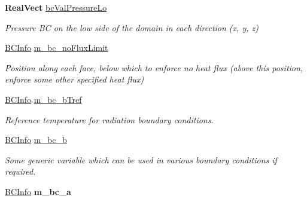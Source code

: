 \begin{DoxyCompactItemize}
\textbf{ Real\+Vect} \hyperlink{class_mushy_layer_params_ac1b2a3539ae1d6b7d716d3796ca221db}{bc\+Val\+Pressure\+Lo}
\begin{DoxyCompactList}\small\item\em Pressure BC on the low side of the domain in each direction (x, y, z) \end{DoxyCompactList}\item 
\mbox{\label{class_mushy_layer_params_a2af9063a5030a32afcc3c2c99933a624}} 
\hyperlink{class_b_c_info}{B\+C\+Info} \hyperlink{class_mushy_layer_params_a2af9063a5030a32afcc3c2c99933a624}{m\+\_\+bc\+\_\+no\+Flux\+Limit}
\begin{DoxyCompactList}\small\item\em Position along each face, below which to enforce no heat flux (above this position, enforce some other specified heat flux) \end{DoxyCompactList}\item 
\mbox{\label{class_mushy_layer_params_a72dce1a01cda103fc315cdab0b0f383a}} 
\hyperlink{class_b_c_info}{B\+C\+Info} \hyperlink{class_mushy_layer_params_a72dce1a01cda103fc315cdab0b0f383a}{m\+\_\+bc\+\_\+b\+Tref}
\begin{DoxyCompactList}\small\item\em Reference temperature for radiation boundary conditions. \end{DoxyCompactList}\item 
\mbox{\label{class_mushy_layer_params_a8b98ef06ad47d5eba490031d95135f42}} 
\hyperlink{class_b_c_info}{B\+C\+Info} \hyperlink{class_mushy_layer_params_a8b98ef06ad47d5eba490031d95135f42}{m\+\_\+bc\+\_\+b}
\begin{DoxyCompactList}\small\item\em Some generic variable which can be used in various boundary conditions if required. \end{DoxyCompactList}\item 
\mbox{\label{class_mushy_layer_params_a355e6ad5af4829cef3c4ded140445787}} 
\hyperlink{class_b_c_info}{B\+C\+Info} {\bfseries m\+\_\+bc\+\_\+a}
\item 
\mbox{\label{class_mushy_layer_params_aac9042c8c6d931f14b718fba83270548}} 

\end{DoxyCompactItemize}

